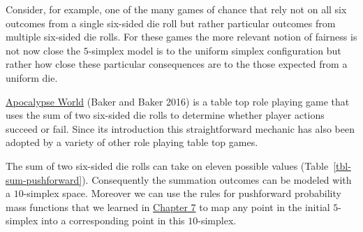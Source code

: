 \documentclass[
  letterpaper,
  DIV=11,
  numbers=noendperiod]{scrartcl}
\begin{document}
Consider, for example, one of the many games of chance that rely not on
all six outcomes from a single six-sided die roll but rather particular
outcomes from multiple six-sided die rolls. For these games the more
relevant notion of fairness is not now close the \(5\)-simplex model is
to the uniform simplex configuration but rather how close these
particular consequences are to the those expected from a uniform die.

\href{http://apocalypse-world.com}{Apocalypse World} (Baker and Baker
2016) is a table top role playing game that uses the sum of two
six-sided die rolls to determine whether player actions succeed or fail.
Since its introduction this straightforward mechanic has also been
adopted by a variety of other role playing table top games.

The sum of two six-sided die rolls can take on eleven possible values
(Table~\ref{tbl-sum-pushforward}). Consequently the summation outcomes
can be modeled with a \(10\)-simplex space. Moreover we can use the
rules for pushforward probability mass functions that we learned in
\href{https://betanalpha.github.io/assets/chapters_html/transforming_probability_spaces.html\#transforming-probability-mass-functions}{Chapter
7} to map any point in the initial \(5\)-simplex into a corresponding
point in this \(10\)-simplex.
\end{document}
